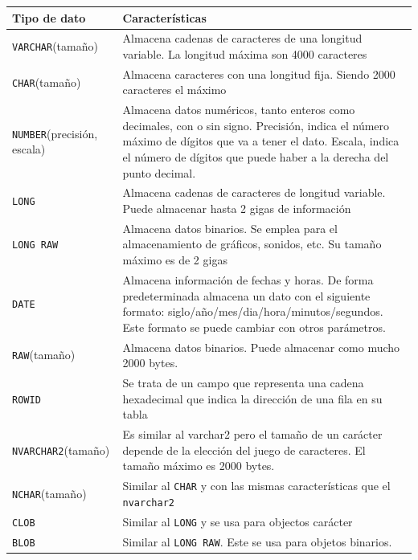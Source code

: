 \begin{center}
  \scriptsize	
  \label{tablaTipoDatos1} %
  \renewcommand{\arrayrulewidth}{1pt}
\begin{tabular}{|p{40mm}|p{98mm}|}\hline
\textbf{Tipo de dato} & \textbf{Caracter\'isticas}\\\hline
\texttt{VARCHAR}(tama\~no) & Almacena cadenas de caracteres de una longitud variable.
La longitud m\'axima son 4000 caracteres \\\hline
\texttt{CHAR}(tama\~no)&
Almacena caracteres con una longitud fija. Siendo 2000 caracteres el m\'aximo\\\hline
\texttt{NUMBER}(precisi\'on, escala) &
Almacena datos num\'ericos, tanto enteros como decimales, con o sin signo. Precisi\'on, indica el n\'umero m\'aximo de d\'igitos que va a tener el dato. Escala, indica el n\'umero de d\'igitos que puede haber a la derecha del punto decimal.\\\hline
\texttt{LONG}&
Almacena cadenas de caracteres de longitud variable. Puede almacenar hasta 2 gigas de informaci\'on\\\hline
\texttt{LONG RAW}&
Almacena datos binarios. Se emplea para el almacenamiento de gr\'aficos, sonidos, etc. Su tama\~no m\'aximo es de 2 gigas\\\hline
\texttt{DATE} &
Almacena informaci\'on de fechas y horas. De forma predeterminada almacena un dato con el siguiente formato: siglo/a\~no/mes/dia/hora/minutos/segundos. Este formato se puede cambiar con otros par\'ametros.\\\hline
\texttt{RAW}(tama\~no)&
Almacena datos binarios. Puede almacenar como mucho 2000 bytes.\\\hline
\texttt{ROWID}&
Se trata de un campo que representa una cadena hexadecimal que indica la direcci\'on de una fila en su tabla\\\hline
\texttt{NVARCHAR2}(tama\~no)&
Es similar al varchar2 pero el tama\~no de un car\'acter depende de la elecci\'on del juego de caracteres. El tama\~no m\'aximo es 2000 bytes.\\\hline
\texttt{NCHAR}(tama\~no)&
Similar al \texttt{CHAR} y con las mismas caracter\'isticas que el \texttt{nvarchar2}\\\hline
\texttt{CLOB}&
Similar al \texttt{LONG} y se usa para objectos car\'acter\\\hline
\texttt{BLOB} &
Similar al \texttt{LONG RAW}. Este se usa para objetos binarios.\\\hline
\end{tabular}
\end{center}
